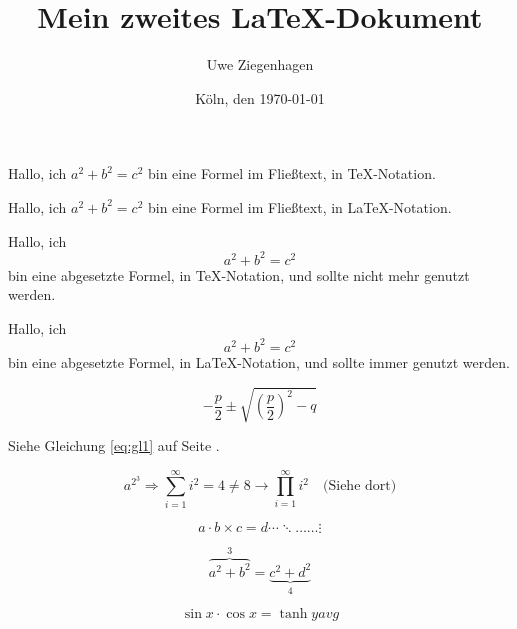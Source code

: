 \documentclass[12pt,ngerman,parskip=half]{scrartcl}
\author{Uwe Ziegenhagen}
\title{Mein zweites \LaTeX-Dokument}
\date{Köln, den \today}
\begin{document}
Hallo, ich $a^2+b^2=c^2$ bin eine Formel im Fließtext, in \TeX-Notation.

Hallo, ich \(a^2+b^2=c^2\) bin eine Formel im Fließtext, in \LaTeX-Notation.

Hallo, ich $$a^2+b^2=c^2$$ bin eine abgesetzte Formel, in \TeX-Notation, und sollte nicht mehr genutzt werden.

Hallo, ich \[a^2+b^2=c^2\] bin eine abgesetzte Formel, in \LaTeX-Notation, und sollte immer genutzt werden.

\begin{equation}\label{eq:gl1}%
-\frac{p}{2} \pm \sqrt{
\left(\frac{p}{2}\right)
^2 - q}
\end{equation}

Siehe Gleichung \ref{eq:gl1} auf Seite \pageref{eq:gl1}.

\begin{equation}
a^{2^3} \Rightarrow \sum_{i=1}^{\infty} i^2 = 4 \not=8 \rightarrow \prod_{i=1}^{\infty} i^2 \quad\mbox{(Siehe dort)}
\end{equation}


\begin{equation}
a \cdot b \times c = d \cdots \ddots \ldots \dots \vdots
\end{equation}

\begin{equation}
\overbrace{a^2+b^2}^3 = \underbrace{c^2 + d^2}_4
\end{equation}

\begin{equation}
\sin x \cdot \cos x = \tanh y avg
\end{equation}
\end{document}
